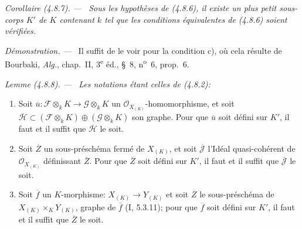 \documentclass[10pt,oneside]{book}
\newenvironment{corollary}[1][]{%
  \par\medskip\noindent\itshape Corollaire (#1). ---\ }{\par}
\newenvironment{lemma}[1][]{%
  \par\medskip\noindent\itshape Lemme (#1). ---\ }{\par}
\newenvironment{proof}{%
  \par\medskip\noindent\textit{Démonstration. ---\ }}{\par}
\begin{document}
\begin{corollary}[4.8.7]
\label{IV.2.4.8.7-fr}
Sous les hypothèses de (4.8.6), il existe un plus petit sous-corps $K'$ de $K$
contenant $k$ tel que les conditions équivalentes de (4.8.6) soient vérifiées.
\end{corollary}

\begin{proof}
Il suffit de le voir pour la condition c), où cela résulte de Bourbaki,
\emph{Alg.}, chap.~II, 3\textsuperscript{e} éd., \S~8,
n\textsuperscript{o}~6, prop.~6.
\end{proof}

\begin{lemma}[4.8.8]
\label{IV.2.4.8.8-fr}
Les notations étant celles de (4.8.2):
\begin{enumerate}
\item[(i)] Soit
$\overline u:\mathscr F\otimes_kK\to\mathscr G\otimes_kK$ un
$\mathcal O_{X_{(K)}}$-homomorphisme, et soit
$\overline{\mathscr H}\subset
(\mathscr F\otimes_kK)\oplus(\mathscr G\otimes_kK)$ son graphe. Pour que
$\overline u$ soit défini sur $K'$, il faut et il suffit que
$\overline{\mathscr H}$ le soit.
\item[(ii)] Soit $\overline Z$ un sous-préschéma fermé de $X_{(K)}$, et soit
$\overline{\mathscr J}$ l'Idéal quasi-cohérent de $\mathcal O_{X_{(K)}}$
définissant $\overline Z$. Pour que $\overline Z$ soit défini sur $K'$, il
faut et il suffit que $\overline{\mathscr J}$ le soit.
\item[(iii)] Soit $\overline f$ un $K$-morphisme:
$X_{(K)}\to Y_{(K)}$ et soit $\overline Z$ le sous-préschéma de
$X_{(K)}\times_KY_{(K)}$, graphe de $\overline f$ (I, 5.3.11); pour que
$\overline f$ soit défini sur $K'$, il faut et il suffit que $\overline Z$ le
soit.
\end{enumerate}
\end{lemma}
\end{document}

